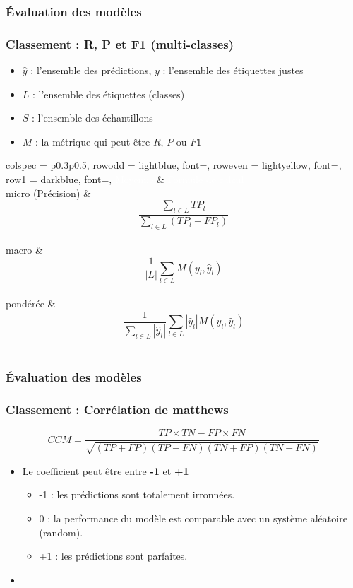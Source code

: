 \documentclass[xcolor=table]{beamer}
\begin{document}
\begin{frame}
	\frametitle{Évaluation des modèles}
	\frametitle{Classement : R, P et F1 (multi-classes)}
	
	\begin{itemize}
		\item $\hat{y}$ : l'ensemble des prédictions, $y$ : l'ensemble des étiquettes justes
		\item $L$ : l'ensemble des étiquettes (classes)
		\item $S$ : l'ensemble des échantillons
		\item $M$ : la métrique qui peut être $R$, $P$ ou $F1$
	\end{itemize}


\begin{center}
	\begin{tblr}{
			colspec = {p{0.3\textwidth}p{0.5\textwidth}},
			row{odd} = {lightblue, font=\small},
			row{even} = {lightyellow, font=\small},
			row{1} = {darkblue, font=\bfseries},
		}
		\textcolor{white}{Moyenne} & \textcolor{white}{Formule de calcul} \\
		micro (Précision) & \vspace{-6pt}\[\frac{\sum_{l \in L} TP_l}{\sum_{l \in L} (TP_l + FP_l)}\]\vspace{-6pt} \\
		macro & \vspace{-6pt}\[\frac{1}{|L|} \sum_{l \in L} M(y_l, \hat{y}_l)\]\vspace{-6pt}\\
		pondérée & \vspace{-6pt}\[\frac{1}{\sum_{l \in L} |\hat{y}_l|} \sum_{l \in L} |\hat{y}_l| M(y_l, \hat{y}_l)\]\vspace{-6pt} \\
	\end{tblr}
\end{center}
	
	
\end{frame}

\begin{frame}
	\frametitle{Évaluation des modèles}
	\frametitle{Classement : Corrélation de matthews}
	
	\[CCM = \frac{TP \times TN - FP \times FN}{\sqrt{(TP + FP)(TP + FN)(TN + FP)(TN + FN)}}\]
	\begin{itemize}
		\item Le coefficient peut être entre \textbf{-1} et \textbf{+1}
		\begin{itemize}
			\item -1 : les prédictions sont totalement irronnées.
			\item 0 : la performance du modèle est comparable avec un système aléatoire (random).
			\item +1 : les prédictions sont parfaites.
		\end{itemize}
		\item {}
	\end{itemize}
	
	
\end{frame}
\end{document}
